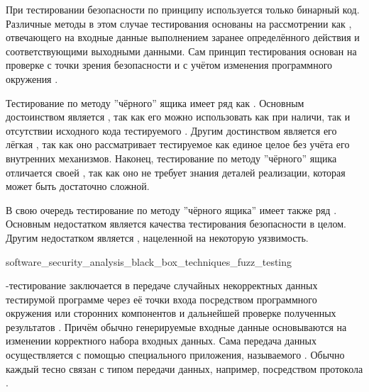 %
При тестировании безопасности  по принципу  используется только бинарный код. 
%
Различные методы в этом случае тестирования основаны на рассмотрении  как , отвечающего на входные данные выполнением заранее определённого действия и соответствующими выходными данными. 
%
Сам принцип тестирования основан на проверке  с точки зрения безопасности и с учётом изменения программного окружения .

%
Тестирование по методу ''чёрного'' ящика имеет ряд как  . 
%
Основным достоинством является , так как его можно использовать как при наличи, так и отсутствии исходного кода тестируемого . 
%
Другим достинством является его лёгкая , так как оно рассматривает тестируемое  как единое целое без учёта его внутренних механизмов. 
%
Наконец, тестирование по методу ''чёрного'' ящика отличается своей , так как оно не требует знания деталей реализации, которая может быть достаточно сложной.

%
В свою очередь тестирование по методу ''чёрного ящика'' имеет также ряд  . 
%
Основным недостатком является  качества тестирования безопасности  в целом. 
%
Другим недостатком является , нацеленной на некоторую уязвимость.


	{software_security_analysis_black_box_techniques_fuzz_testing}

%
-тестирование заключается в передаче случайных некорректных данных тестирумой программе через её точки входа посредством программного окружения или сторонних компонентов и дальнейшей проверке полученных результатов . 
%
Причём обычно генерируемые входные данные основываются на изменении корректного набора входных данных. 
%
Сама передача данных осуществляется с помощью специального приложения, называемого . 
%
Обычно каждый  тесно связан с типом передачи данных, например, посредством протокола  . 

